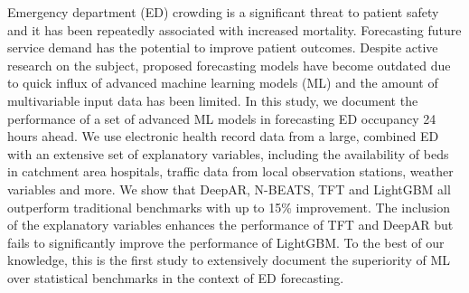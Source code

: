 Emergency department (ED) crowding is a significant threat to patient safety and it has been repeatedly associated with increased mortality. Forecasting future service demand has the potential to improve patient outcomes. Despite active research on the subject, proposed forecasting models have become outdated due to quick influx of advanced machine learning models (ML) and the amount of multivariable input data has been limited. In this study, we document the performance of a set of advanced ML models in forecasting ED occupancy 24 hours ahead. We use electronic health record data from a large, combined ED with an extensive set of explanatory variables, including the availability of beds in catchment area hospitals, traffic data from local observation stations, weather variables and more. We show that DeepAR, N-BEATS, TFT and LightGBM all outperform traditional benchmarks with up to 15\% improvement. The inclusion of the explanatory variables enhances the performance of TFT and DeepAR but fails to significantly improve the performance of LightGBM. To the best of our knowledge, this is the first study to extensively document the superiority of ML over statistical benchmarks in the context of ED forecasting.

